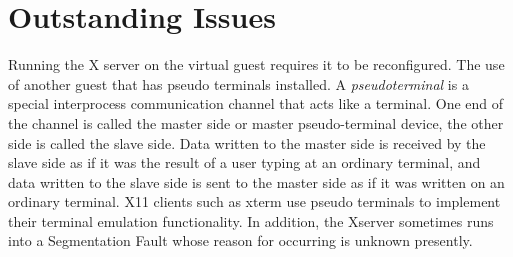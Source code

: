 \documentclass{acm_proc_article-sp}
\begin{document}
\section{Outstanding Issues}
Running the X server on the virtual guest requires it to be reconfigured. The
use of another guest that has pseudo terminals installed. A
\textit{pseudo\textunderscore terminal} is a special interprocess communication
channel that acts like a terminal. One end of the channel is called the master side or master pseudo-terminal device, 
the other side is called the slave side. 
Data written to the master side is received by the slave side as if it was the result of a user typing at an ordinary terminal, 
and data written to the slave side is sent to the master side as if it was written on an ordinary terminal.
X11 clients such as xterm use pseudo terminals to implement their terminal emulation functionality.
In addition, the Xserver sometimes runs into a Segmentation Fault whose reason for occurring is unknown presently.
\end{document}
